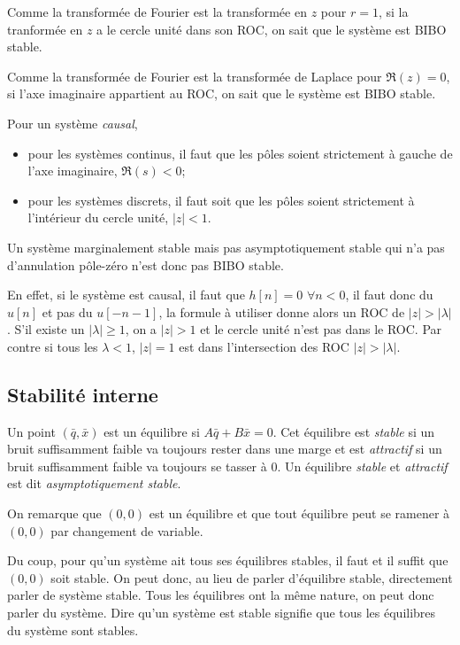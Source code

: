 Comme la transformée de Fourier
est la transformée en $z$ pour $r = 1$,
si la tranformée en $z$ a le cercle unité dans son ROC, on sait
que le système est BIBO stable.

Comme la transformée de Fourier est la transformée de Laplace pour $\Re(z) = 0$,
si l'axe imaginaire appartient au ROC, on sait
que le système est BIBO stable.

Pour un système \emph{causal},
\begin{itemize}
  \item pour les systèmes continus, il faut que les pôles soient
    strictement à gauche de l'axe imaginaire, $\Re(s) < 0$;
  \item pour les systèmes discrets, il faut soit que les pôles soient
    strictement à l'intérieur du cercle unité, $|z| < 1$.
\end{itemize}
Un système marginalement stable mais pas asymptotiquement stable
qui n'a pas d'annulation pôle-zéro n'est donc pas BIBO stable.

En effet, si le système est causal, il faut que $h[n] = 0$ $\forall n < 0$,
il faut donc du $u[n]$ et pas du $u[-n-1]$, la formule à utiliser donne
alors un ROC de $|z| > |\lambda|$.
S'il existe un $|\lambda| \geq 1$,
on a $|z| > 1$ et le cercle unité n'est pas
dans le ROC.
Par contre si tous les $\lambda < 1$, $|z| = 1$ est dans l'intersection
des ROC $|z| > |\lambda|$.

\subsection{Stabilité interne}
Un point $(\bar{q}, \bar{x})$ est un équilibre si $A\bar{q} + B\bar{x} = 0$.
Cet équilibre est \emph{stable} si un bruit suffisamment faible
va toujours rester dans une marge et est \emph{attractif} si
un bruit suffisamment faible va toujours se tasser à 0.
Un équilibre \emph{stable} et \emph{attractif}
est dit \emph{asymptotiquement stable}.

On remarque que $(0,0)$ est un équilibre et que tout équilibre peut se
ramener à $(0,0)$ par changement de variable.

Du coup, pour qu'un système ait tous ses équilibres stables,
il faut et il suffit que $(0,0)$ soit stable.
On peut donc, au lieu de parler d'équilibre stable,
directement parler de système stable.
Tous les équilibres ont la même nature,
on peut donc parler du système.
Dire qu'un système est stable
signifie que tous les équilibres du système sont stables.

